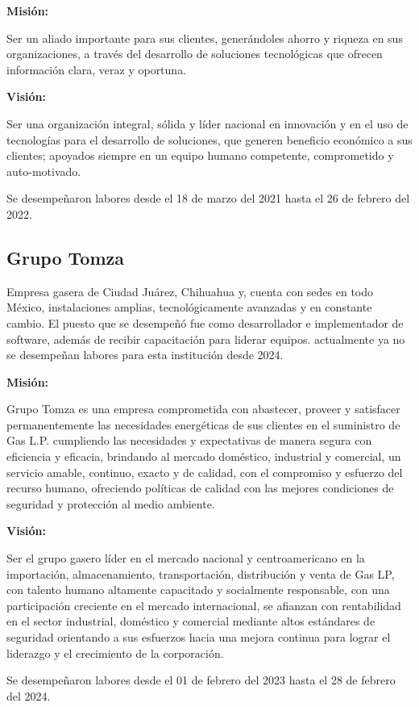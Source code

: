 \documentclass[protocolo.tex]{subfiles}
\begin{document}
\textbf{Misión:}

Ser un aliado importante para sus clientes, generándoles ahorro y riqueza en sus organizaciones, a través del desarrollo de soluciones tecnológicas que ofrecen información clara, veraz y oportuna.\vspace{5mm} 


\textbf{Visión:}

Ser una organización integral, sólida y líder nacional en innovación y en el uso de tecnologías para el desarrollo de soluciones, que generen beneficio económico a sus clientes; apoyados siempre en un equipo humano competente, comprometido y auto-motivado.\vspace{5mm}


Se desempeñaron labores desde el 18 de marzo del 2021 hasta el 26 de febrero del 2022.





\subsection{Grupo Tomza}
Empresa gasera de Ciudad Juárez, Chihuahua y, cuenta con sedes en todo México, instalaciones amplias, 
tecnológicamente avanzadas y en constante cambio.
El puesto que se desempeñó fue como desarrollador e implementador de software, 
además de recibir capacitación para liderar equipos. 
actualmente ya no se desempeñan labores para esta institución desde 2024.\vspace{5mm} 

\textbf{Misión:}

Grupo Tomza es una empresa comprometida con abastecer, proveer y satisfacer permanentemente las necesidades energéticas de sus clientes en el suministro de Gas L.P. cumpliendo las necesidades y expectativas de manera segura con eficiencia y eficacia, brindando al mercado doméstico, industrial y comercial, un servicio amable, continuo, exacto y de calidad, con el compromiso y esfuerzo del recurso humano, ofreciendo políticas de calidad con las mejores condiciones de seguridad y protección al medio ambiente.\vspace{5mm} 

\textbf{Visión:} 

Ser el grupo gasero líder en el mercado nacional y centroamericano en la importación, almacenamiento, transportación, distribución y venta de Gas LP, con talento humano altamente capacitado y socialmente responsable, con una participación creciente en el mercado internacional, se afianzan con rentabilidad en el sector industrial, doméstico y comercial mediante altos estándares de seguridad orientando a sus esfuerzos hacia una mejora continua para lograr el liderazgo y el crecimiento de la corporación.\vspace{5mm} 

Se desempeñaron labores desde el 01 de febrero del 2023 hasta el 28 de febrero del 2024.
\end{document}
